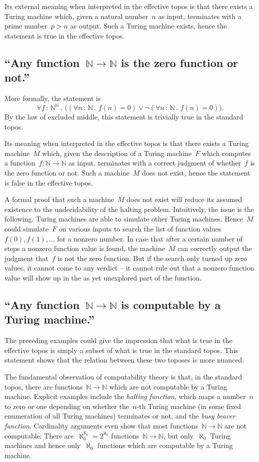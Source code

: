 \documentclass[oneside]{amsart}
\theoremstyle{definition}
\theoremstyle{plain}
\theoremstyle{remark}
\newcommand{\NN}{\mathbb{N}}
\renewcommand{\_}{\mathpunct{.}\,}
\newcommand{\effective}{ef{}fective\xspace}
\newcommand{\?}{\,{:}\,}
\begin{document}
Its external meaning when interpreted in the \effective topos is that there exists
a Turing machine which, given a natural number~$n$ as input, terminates with a
prime number~$p > n$ as output. Such a Turing machine exists, hence the
statement is true in the \effective topos.


\subsection*{``Any function~$\NN \to \NN$ is the zero function or not.''} More
formally, the statement is
\[ \forall f \? \NN^\NN\_
  \bigl((\forall n \? \NN\_ f(n) = 0) \vee
  \neg
  (\forall n \? \NN\_ f(n) = 0)\bigr). \]
By the law of excluded middle, this statement is trivially true in the standard
topos.

Its meaning when interpreted in the \effective topos is that there exists a
Turing machine~$M$ which, given the description of a Turing machine~$F$ which
computes a function~$f : \NN \to \NN$ as input, terminates with a correct
judgment of whether~$f$ is the zero function or not. Such a machine~$M$ does
not exist, hence the statement is false in the \effective topos.

A formal proof that such a machine~$M$ does not exist will reduce its assumed
existence to the undecidability of the halting problem. Intuitively, the issue
is the following. Turing machines are able to simulate other Turing machines.
Hence~$M$ could simulate~$F$ on various inputs to search the list of
function values~$f(0), f(1), \ldots$ for a nonzero number. In case that after
a certain number of steps a nonzero function value is found, the machine~$M$
can correctly output the judgment that~$f$ is not the zero function. But if the
search only turned up zero values, it cannot come to any verdict -- it cannot
rule out that a nonzero function value will show up in the as yet unexplored
part of the function.


\subsection*{``Any function~$\NN \to \NN$ is computable by a Turing machine.''}
The preceding examples could give the impression that what is true in the
\effective topos is simply a subset of what is true in the standard topos. This
statement shows that the relation between these two toposes is more nuanced.

The fundamental observation of computability theory is that, in the standard
topos, there are functions~$\NN \to \NN$ which are not computable by a Turing
machine. Explicit examples include the \emph{halting
function}, which maps a number~$n$ to zero or one depending on whether
the~$n$-th Turing machine (in some fixed enumeration of all Turing machines)
terminates or not, and the \emph{busy beaver function}. Cardinality arguments
even show that most functions~$\NN \to \NN$ are not computable: There
are~$\aleph_0^{\aleph_0} = 2^{\aleph_0}$ functions~$\NN \to \NN$, but
only~$\aleph_0$ Turing machines and hence only~$\aleph_0$ functions which are
computable by a Turing machine.
\end{document}
